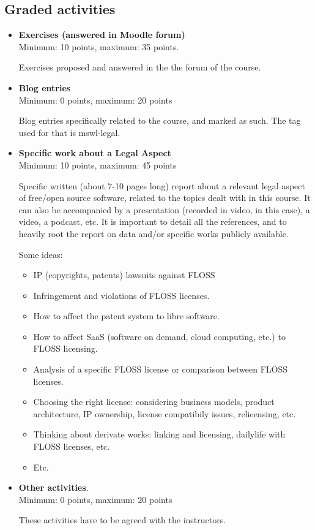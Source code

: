 \documentclass[a4paper]{article}
\begin{document}
\subsection{Graded activities}

\begin{itemize}
\item \textbf{Exercises (answered in Moodle forum)} \\
  Minimum: 10 points, maximum: 35 points.

  Exercises proposed and answered in the the forum of the course.

\item \textbf{Blog entries} \\
  Minimum: 0 points, maximum: 20 points

  Blog entries specifically related to the course, and marked as such. The tag used for that is mswl-legal.

\item \textbf{Specific work about a Legal Aspect} \\
  Minimum: 10 points, maximum: 45 points

  Specific written (about 7-10 pages long) report about a relevant legal aspect of free/open source software, related to the topics dealt with in this course. It can also be accompanied by a presentation (recorded in video, in this case), a video, a podcast, etc. It is important to detail all the references, and to heavily root the report on data and/or specific works publicly available.

\medskip

Some ideas:

\begin{itemize}
\item IP (copyrights, patents) lawsuits against FLOSS
\item Infringement and violations of FLOSS licenses.
\item How to affect the patent system to libre software.
\item How to affect SaaS (software on demand, cloud computing, etc.) to FLOSS licensing.
\item Analysis of a specific FLOSS license or comparison between FLOSS licenses.
\item Choosing the right license: considering business models, product architecture,  IP ownership, license compatibily issues, relicensing, etc.
\item Thinking about derivate works: linking and licensing, dailylife with FLOSS licenses, etc.
\item Etc.

\end{itemize}



\item \textbf{Other activities}. \\
  Minimum: 0 points, maximum: 20 points

  These activities have to be agreed with the instructors.
\end{itemize}
\end{document}
